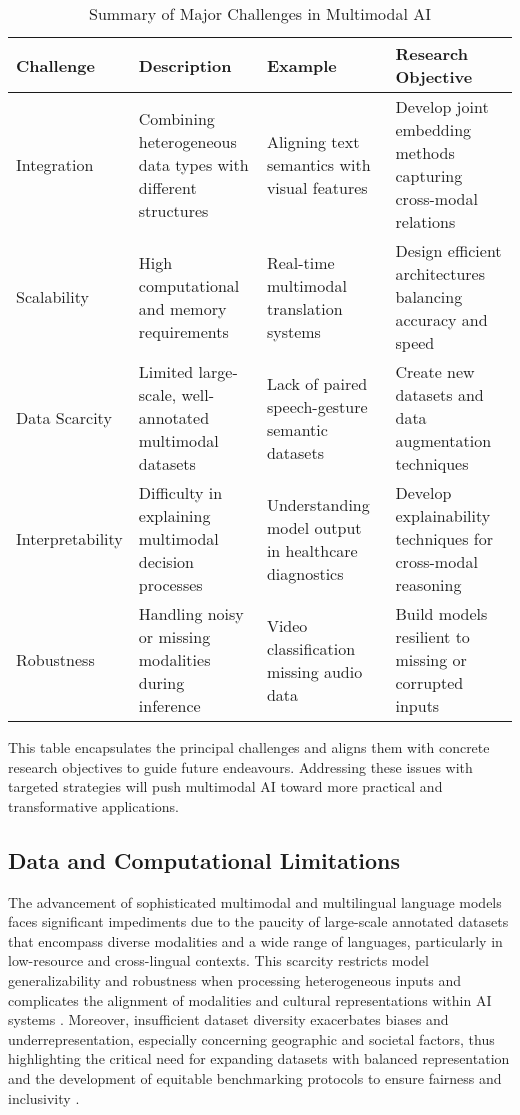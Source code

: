 \documentclass[sigconf]{acmart}
\begin{document}
\begin{table*}[htbp]
\centering
\caption{Summary of Major Challenges in Multimodal AI}
\label{tab:challenges}
\begin{adjustbox}{max width=\textwidth}
\begin{tabular}{@{}llll@{}}
\toprule
Challenge & Description & Example & Research Objective \\ \midrule
Integration & Combining heterogeneous data types with different structures & Aligning text semantics with visual features & Develop joint embedding methods capturing cross-modal relations \\ 
Scalability & High computational and memory requirements & Real-time multimodal translation systems & Design efficient architectures balancing accuracy and speed \\
Data Scarcity & Limited large-scale, well-annotated multimodal datasets & Lack of paired speech-gesture semantic datasets & Create new datasets and data augmentation techniques \\
Interpretability & Difficulty in explaining multimodal decision processes & Understanding model output in healthcare diagnostics & Develop explainability techniques for cross-modal reasoning \\
Robustness & Handling noisy or missing modalities during inference & Video classification missing audio data & Build models resilient to missing or corrupted inputs \\ \bottomrule
\end{tabular}
\end{adjustbox}
\end{table*}

This table encapsulates the principal challenges and aligns them with concrete research objectives to guide future endeavours. Addressing these issues with targeted strategies will push multimodal AI toward more practical and transformative applications.

\subsection{Data and Computational Limitations}

The advancement of sophisticated multimodal and multilingual language models faces significant impediments due to the paucity of large-scale annotated datasets that encompass diverse modalities and a wide range of languages, particularly in low-resource and cross-lingual contexts. This scarcity restricts model generalizability and robustness when processing heterogeneous inputs and complicates the alignment of modalities and cultural representations within AI systems \cite{ref2,ref4,ref5,ref21,ref28,ref30}. Moreover, insufficient dataset diversity exacerbates biases and underrepresentation, especially concerning geographic and societal factors, thus highlighting the critical need for expanding datasets with balanced representation and the development of equitable benchmarking protocols to ensure fairness and inclusivity \cite{ref12,ref26,ref27,ref30}.
\end{document}
